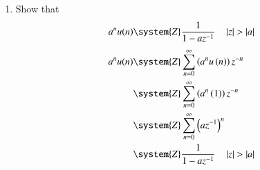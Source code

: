 \documentclass[journal,12pt,twocolumn]{IEEEtran}
\theoremstyle{remark}
\begin{document}
\begin{enumerate}[label=\thesection.\arabic*
,ref=\thesection.\theenumi]
\begin{enumerate}[label=\thesection.\arabic*
,ref=\thesection.\theenumi]
\solution It is easy to show that
\begin{equation}
\delta(n) \system{Z} 1
\end{equation}
and from \eqref{eq:unit_step},
\begin{align}
U(z) &= \sum _{n= 0}^{\infty}z^{-n}
\\
&=\frac{1}{1-z^{-1}}, \quad \abs{z} > 1
\end{align}
using the formula for the sum of an infinite geometric progression.
%
\item Show that 
\begin{equation}
\label{eq:anun}
a^nu(n) \system{Z} \frac{1}{1-az^{-1}} \quad \abs{z} > \abs{a}
\end{equation}
\solution 
\begin{align}
	a^nu(n) &\system{Z} \sum_{n = 0}^{\infty}\brak{a^nu\brak n}z^{-n} \\
        &\system{Z} \sum_{n = 0}^{\infty}\brak{a^n\brak{1}}z^{-n} \\
        &\system{Z} \sum_{n = 0}^{\infty}\brak{az^{-1}}^{n} \\
	&\system{Z} \frac{1}{1-az^{-1}} \quad \abs{z} > \abs{a}
\end{align}\\
\\


\end{enumerate}
\end{enumerate}
\end{document}
